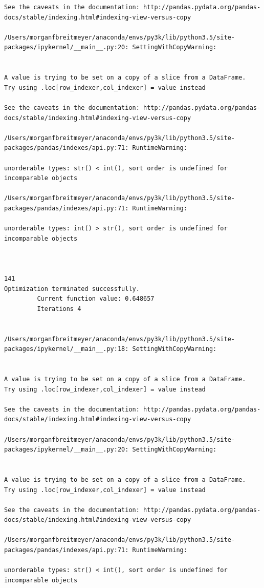 \begin{lstlisting}
See the caveats in the documentation: http://pandas.pydata.org/pandas-docs/stable/indexing.html#indexing-view-versus-copy

/Users/morganfbreitmeyer/anaconda/envs/py3k/lib/python3.5/site-packages/ipykernel/__main__.py:20: SettingWithCopyWarning:


A value is trying to be set on a copy of a slice from a DataFrame.
Try using .loc[row_indexer,col_indexer] = value instead

See the caveats in the documentation: http://pandas.pydata.org/pandas-docs/stable/indexing.html#indexing-view-versus-copy

/Users/morganfbreitmeyer/anaconda/envs/py3k/lib/python3.5/site-packages/pandas/indexes/api.py:71: RuntimeWarning:

unorderable types: str() < int(), sort order is undefined for incomparable objects

/Users/morganfbreitmeyer/anaconda/envs/py3k/lib/python3.5/site-packages/pandas/indexes/api.py:71: RuntimeWarning:

unorderable types: int() > str(), sort order is undefined for incomparable objects



141
Optimization terminated successfully.
         Current function value: 0.648657
         Iterations 4


/Users/morganfbreitmeyer/anaconda/envs/py3k/lib/python3.5/site-packages/ipykernel/__main__.py:18: SettingWithCopyWarning:


A value is trying to be set on a copy of a slice from a DataFrame.
Try using .loc[row_indexer,col_indexer] = value instead

See the caveats in the documentation: http://pandas.pydata.org/pandas-docs/stable/indexing.html#indexing-view-versus-copy

/Users/morganfbreitmeyer/anaconda/envs/py3k/lib/python3.5/site-packages/ipykernel/__main__.py:20: SettingWithCopyWarning:


A value is trying to be set on a copy of a slice from a DataFrame.
Try using .loc[row_indexer,col_indexer] = value instead

See the caveats in the documentation: http://pandas.pydata.org/pandas-docs/stable/indexing.html#indexing-view-versus-copy

/Users/morganfbreitmeyer/anaconda/envs/py3k/lib/python3.5/site-packages/pandas/indexes/api.py:71: RuntimeWarning:

unorderable types: str() < int(), sort order is undefined for incomparable objects


\end{lstlisting}
